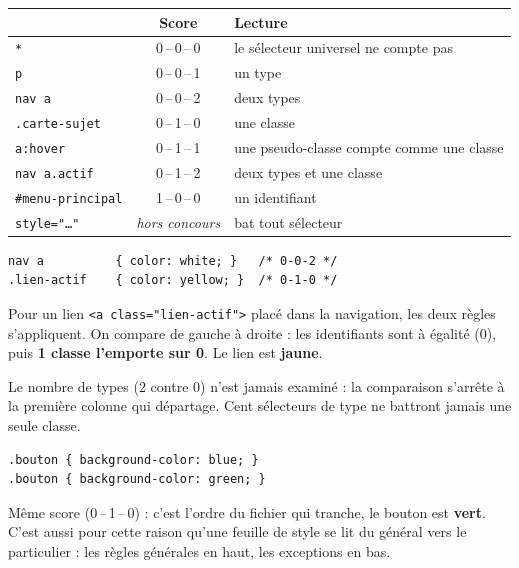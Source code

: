 \documentclass[a4paper,11pt]{article}
\newcommand{\hdr}[1]{\multicolumn{1}{l}{\color{white}\bfseries #1}}
\newcommand{\hdrc}[1]{\multicolumn{1}{c}{\color{white}\bfseries #1}}
\renewcommand{\arraystretch}{1.3}
\begin{document}
\begin{center}
\renewcommand{\arraystretch}{1.0}
\begin{tabularx}{\linewidth}{p{5cm}cX}
  \toprule
  \rowcolor{uniNavy}
  \hdr{Sélecteur} & \hdrc{Score} & \hdr{Lecture} \\
  \midrule
  \rowcolor{uniPaper}
  \texttt{*} & 0\,--\,0\,--\,0 & le sélecteur universel ne compte pas \\
  \texttt{p} & 0\,--\,0\,--\,1 & un type \\
  \rowcolor{uniPaper}
  \texttt{nav a} & 0\,--\,0\,--\,2 & deux types \\
  \texttt{.carte-sujet} & 0\,--\,1\,--\,0 & une classe \\
  \rowcolor{uniPaper}
  \texttt{a:hover} & 0\,--\,1\,--\,1 & une pseudo-classe compte comme une classe \\
  \texttt{nav a.actif} & 0\,--\,1\,--\,2 & deux types et une classe \\
  \rowcolor{uniPaper}
  \texttt{\#menu-principal} & 1\,--\,0\,--\,0 & un identifiant \\
  \texttt{style="\ldots"} & \textit{hors concours} & bat tout sélecteur \\
  \bottomrule
\end{tabularx}
\end{center}

\begin{tcolorbox}[corrige, title={Exemple --- qui gagne ?}]
\begin{lstlisting}[language=CSS3, numbers=none]
nav a          { color: white; }   /* 0-0-2 */
.lien-actif    { color: yellow; }  /* 0-1-0 */
\end{lstlisting}

\vspace{3pt}
Pour un lien \texttt{<a class="lien-actif">} placé dans la navigation, les deux règles s'appliquent. On compare de gauche à droite : les identifiants sont à égalité (0), puis \textbf{1 classe l'emporte sur 0}. Le lien est \textbf{jaune}.

\vspace{3pt}
Le nombre de types (2 contre 0) n'est jamais examiné : la comparaison s'arrête à la première colonne qui départage. Cent sélecteurs de type ne battront jamais une seule classe.
\end{tcolorbox}

\begin{tcolorbox}[attention, title={À spécificité égale, le dernier écrit gagne}]
\begin{lstlisting}[language=CSS3, numbers=none]
.bouton { background-color: blue; }
.bouton { background-color: green; }
\end{lstlisting}

\vspace{3pt}
Même score (0\,--\,1\,--\,0) : c'est l'ordre du fichier qui tranche, le bouton est \textbf{vert}. C'est aussi pour cette raison qu'une feuille de style se lit du général vers le particulier : les règles générales en haut, les exceptions en bas.
\end{tcolorbox}
\end{document}
